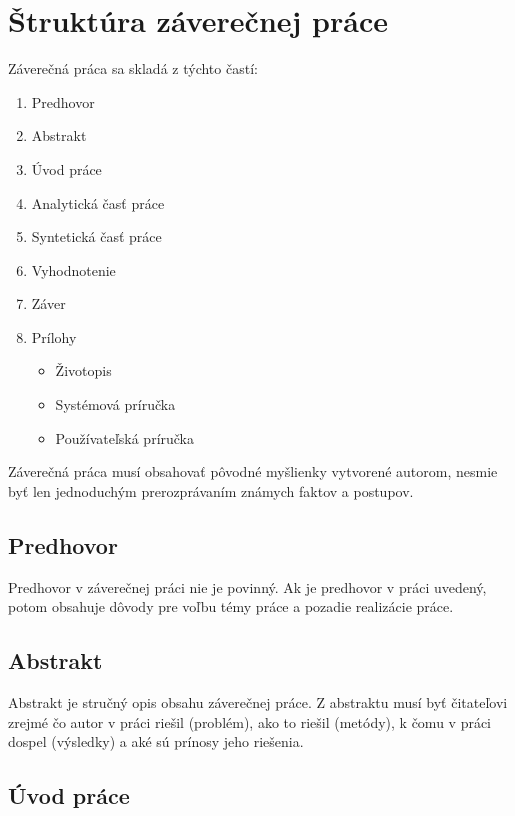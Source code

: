 
\chapter{Štruktúra záverečnej práce}
\label{ch:struktura}

Záverečná práca sa skladá z týchto častí:

\begin{enumerate}
    \item Predhovor
    \item Abstrakt
    \item Úvod práce
    \item Analytická časť práce
    \item Syntetická časť práce
    \item Vyhodnotenie
    \item Záver
	\item Prílohy
	\begin{itemize}
	    \item Životopis
	    \item Systémová príručka
	    \item Používateľská príručka
	\end{itemize}
\end{enumerate}

Záverečná práca musí obsahovať pôvodné myšlienky vytvorené autorom, nesmie byť len jednoduchým prerozprávaním známych faktov a postupov.

\section{Predhovor}

Predhovor v záverečnej práci nie je povinný. Ak je predhovor v práci uvedený, potom obsahuje dôvody pre
voľbu témy práce a pozadie realizácie práce.

\section{Abstrakt}

Abstrakt je stručný opis obsahu záverečnej práce. Z abstraktu musí byť čitateľovi zrejmé čo autor v práci
riešil (problém), ako to riešil (metódy), k čomu v práci dospel (výsledky) a aké sú prínosy jeho riešenia.

\section{Úvod práce}

